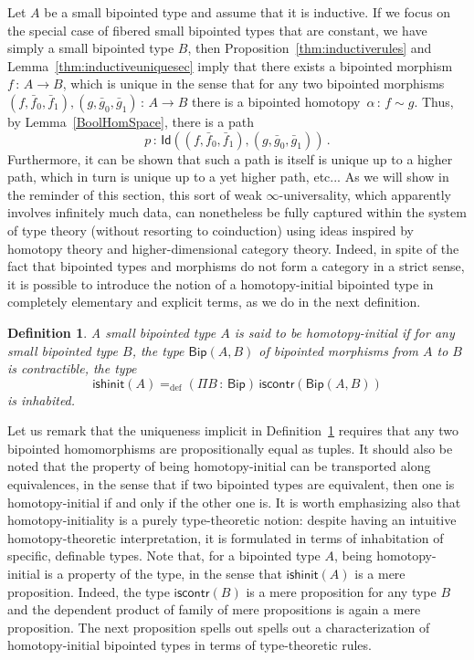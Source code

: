\documentclass[10pt,a4paper,oneside,reqno]{amsart}
\theoremstyle{mythm}
\theoremstyle{mydef}
\newtheorem{definition}[theorem]{Definition}
\theoremstyle{myrmk}
\newcommand{\ie}{\text{i.e.\ }}
\newcommand{\defeq}{=_{\mathrm{def}}}
\newcommand{\co}{\,{:}\,}
\newcommand{\iscontr}{\mathsf{iscontr}}
\newcommand{\ishinit}{\mathsf{ishinit}}
\newcommand{\Id}{\mathsf{Id}}
\newcommand{\Bip}{\mathsf{Bip}}
\newcommand{\BipHom}{\mathsf{Bip}}
\begin{document}
 \medskip
 
 Let $A$ be a small bipointed type and assume that it is inductive. 
  If we focus on the special case of fibered small bipointed types that 
are constant, \ie we have simply a small bipointed type $B$, then 
 Proposition~\ref{thm:inductiverules} and Lemma~\ref{thm:inductiveuniquesec}
imply that there exists a bipointed morphism~$f \co A \to B$, which is unique in the sense that  for any two bipointed morphisms $(f, \bar{f}_0, \bar{f}_1), (g, \bar{g}_0, \bar{g}_1) \co A \to B$  there is a bipointed homotopy~$\alpha \co f \sim g$. Thus, by Lemma~\ref{BoolHomSpace}, there is a path 
\[
p \co \Id((f, \bar{f}_0, \bar{f}_1), (g, \bar{g}_0, \bar{g}_1)) \, .
\] 
Furthermore, it can be shown that such a path is itself is unique up to a higher path, which in turn is unique up to a yet higher path, etc... As we will show in the reminder of this section, this sort of weak $\infty$-universality, which apparently involves infinitely much data, can nonetheless be fully captured within the system of type theory (without resorting to coinduction) using ideas inspired by homotopy theory and higher-dimensional category theory. Indeed, in spite of the fact that bipointed types and morphisms do not form a category in a strict sense, it is possible to introduce the  notion of a homotopy-initial bipointed type in completely elementary and explicit terms, as we do in the next definition.


\begin{definition}\label{def:BoolInit}
A small bipointed type $A$ is said to be \emph{homotopy-initial}  if for any small bipointed type $B$, the type $\BipHom(A,B)$ of bipointed morphisms from $A$ to $B$
is contractible, \ie the type
\[
\ishinit(A) \defeq (\Pi B \co \Bip) \, \iscontr(\BipHom(A, B) )
\] 
is inhabited.
\end{definition}

Let us remark that the uniqueness implicit in Definition~\ref{def:BoolInit} requires that any two bipointed homomorphisms are propositionally equal as tuples. It should also be noted that the property of being  homotopy-initial  can be transported along equivalences, in the sense that if two bipointed types are equivalent, then one is homotopy-initial if and only if the other one is. It is worth emphasizing also that homotopy-initiality is a purely type-theoretic notion: despite having an intuitive homotopy-theoretic interpretation, it is formulated in terms of inhabitation of specific, definable types. Note that, for a bipointed type $A$, being homotopy-initial is a property of the type, in the
sense that $\ishinit(A)$ is a mere proposition. Indeed, the type $\iscontr(B)$ is a mere proposition for any type $B$ and the dependent product of family of mere propositions is again a mere proposition.  The next proposition spells out spells out a  characterization of homotopy-initial bipointed types in terms of type-theoretic rules.
\end{document}
